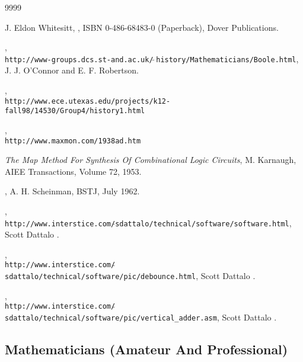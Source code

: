 \begin{thecustombibliography}{9999}

J. Eldon Whitesitt,
, 
ISBN 0-486-68483-0 (Paperback),
Dover Publications.

, \\
\texttt{http://www-groups.dcs.st-and.ac.uk/$\,\tilde{}\,$history/Mathematicians/Boole.html},
J. J. O'Connor and E. F. Robertson.

, \\
\texttt{http://www.ece.utexas.edu/projects/k12-fall98/14530/Group4/history1.html}

, \\
\texttt{http://www.maxmon.com/1938ad.htm}

{\em The Map Method For Synthesis Of Combinational Logic Circuits}, 
M. Karnaugh, AIEE Transactions, Volume 72, 1953.

, 
A. H. Scheinman, BSTJ, July 1962.

, \\
\texttt{http://www.interstice.com/$\tilde{}$sdattalo/technical/software/software.html},
Scott Dattalo \cite{bibref:i:scottdattalo}.

, \\
\texttt{http://www.interstice.com/$\tilde{}$sdattalo/technical/software/pic/debounce.html},
Scott Dattalo \cite{bibref:i:scottdattalo}.

, \\
\texttt{http://www.interstice.com/$\tilde{}$sdattalo/technical/software/pic/vertical\_adder.asm},
Scott Dattalo \cite{bibref:i:scottdattalo}.

\end{thecustombibliography}


\subsection*{Mathematicians (Amateur And Professional)}

